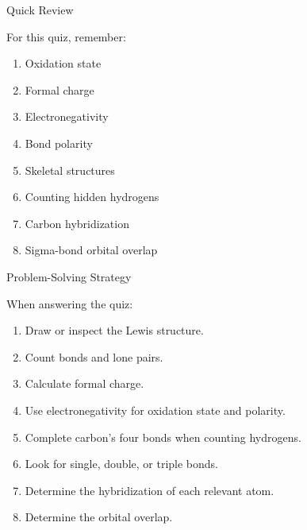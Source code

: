 \documentclass[aspectratio=169]{beamer}
\begin{document}
\begin{frame}[t]{Quick Review}
\small

For this quiz, remember:

\begin{enumerate}
    \setlength{\itemsep}{0.08cm}
    \item Oxidation state
    \item Formal charge
    \item Electronegativity
    \item Bond polarity
    \item Skeletal structures
    \item Counting hidden hydrogens
    \item Carbon hybridization
    \item Sigma-bond orbital overlap
\end{enumerate}

\end{frame}

\begin{frame}[t]{Problem-Solving Strategy}
\small

When answering the quiz:

\begin{enumerate}
    \setlength{\itemsep}{0.08cm}
    \item Draw or inspect the Lewis structure.
    \item Count bonds and lone pairs.
    \item Calculate formal charge.
    \item Use electronegativity for oxidation state and polarity.
    \item Complete carbon's four bonds when counting hydrogens.
    \item Look for single, double, or triple bonds.
    \item Determine the hybridization of each relevant atom.
    \item Determine the orbital overlap.
\end{enumerate}

\end{frame}
\end{document}
